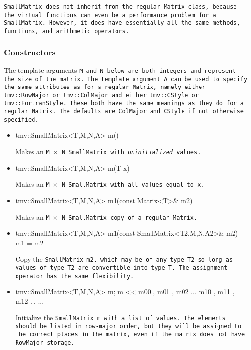 \tt{SmallMatrix} does not inherit from the regular \tt{Matrix} class, because the virtual functions can even be a performance problem for a \tt{SmallMatrix}.  However, it does have
essentially all the same methods, functions, and arithmetic operators. 

\subsubsection{Constructors}
\label{SmallMatrix_Constructors}

The template arguments \tt{M} and \tt{N} below are both integers and
represent the size of the matrix.
The template argument \tt{A} can be used to specify the same attributes
as for a regular \tt{Matrix}, namely either \tt{tmv::RowMajor} or
\tt{tmv::ColMajor} and either \tt{tmv::CStyle} or
\tt{tmv::FortranStyle}.  These both have the same meanings as they do 
for a regular \tt{Matrix}. The defaults are \tt{ColMajor} and \tt{CStyle} if 
not otherwise specified.

\begin{itemize}
\item 
\begin{tmvcode}
tmv::SmallMatrix<T,M,N,A> m()
\end{tmvcode}
Makes an \tt{M} $\times$ \tt{N} \tt{SmallMatrix} 
with {\em uninitialized} values.

\item
\begin{tmvcode}
tmv::SmallMatrix<T,M,N,A> m(T x)
\end{tmvcode}
Makes an \tt{M} $\times$ \tt{N} \tt{SmallMatrix} with all values equal to \tt{x}.

\item 
\begin{tmvcode}
tmv::SmallMatrix<T,M,N,A> m1(const Matrix<T>& m2)
\end{tmvcode}
Makes an \tt{M} $\times$ \tt{N} \tt{SmallMatrix} copy of a regular \tt{Matrix}.

\item
\begin{tmvcode}
tmv::SmallMatrix<T,M,N,A> m1(const SmallMatrix<T2,M,N,A2>& m2)
m1 = m2
\end{tmvcode}
Copy the \tt{SmallMatrix m2}, which may be of any type \tt{T2} so long
as values of type \tt{T2} are convertible into type \tt{T}.
The assignment operator has the same flexibility.

\item
\begin{tmvcode}
tmv::SmallMatrix<T,M,N,A> m;
m << m00 , m01 , m02 ...
     m10 , m11 , m12 ...
     ...
\end{tmvcode}
Initialize the \tt{SmallMatrix m} with a list of values.  The elements should be listed in 
row-major order, but they will be assigned to the correct places in the matrix, even if the 
matrix does not have \tt{RowMajor} storage.

\end{itemize}


